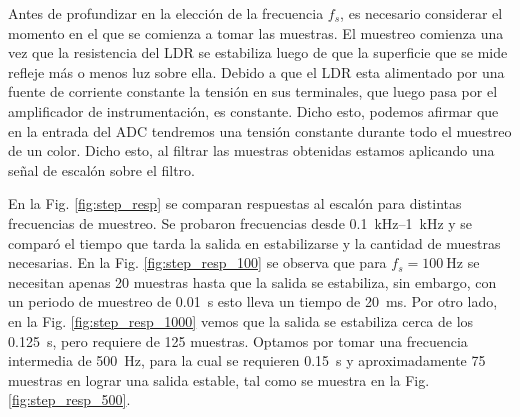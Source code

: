 \documentclass[12pt,a4paper,twoside,fleqn]{article}
\begin{document}
Antes de profundizar en la elección de la frecuencia $f_s$, es necesario considerar el momento en el que se comienza a tomar las muestras. El muestreo comienza una vez que la resistencia del LDR se estabiliza luego de que la superficie que se mide refleje más o menos luz sobre ella. Debido a que el LDR esta alimentado por una fuente de corriente constante la tensión en sus terminales, que luego pasa por el amplificador de instrumentación, es constante. Dicho esto, podemos afirmar que en la entrada del ADC tendremos una tensión constante durante todo el muestreo de un color. Dicho esto, al filtrar las muestras obtenidas estamos aplicando una señal de escalón sobre el filtro.

En la Fig. \ref{fig:step_resp} se comparan respuestas al escalón para distintas frecuencias de muestreo. Se probaron frecuencias desde \qtyrange{.1}{1}{\kHz} y se comparó el tiempo que tarda la salida en estabilizarse y la cantidad de muestras necesarias.
En la Fig. \ref{fig:step_resp_100} se observa que para $f_s=\qty{100}{\Hz}$ se necesitan apenas 20 muestras hasta que la salida se estabiliza, sin embargo, con un periodo de muestreo de \qty{.01}{\s} esto lleva un tiempo de \qty{20}{\ms}. Por otro lado, en la Fig. \ref{fig:step_resp_1000} vemos que la salida se estabiliza cerca de los \qty{.125}{\s}, pero requiere de 125 muestras. Optamos por tomar una frecuencia intermedia de \qty{500}{\Hz}, para la cual se requieren \qty{.15}{\s} y aproximadamente 75 muestras en lograr una salida estable, tal como se muestra en la Fig. \ref{fig:step_resp_500}.
\end{document}
